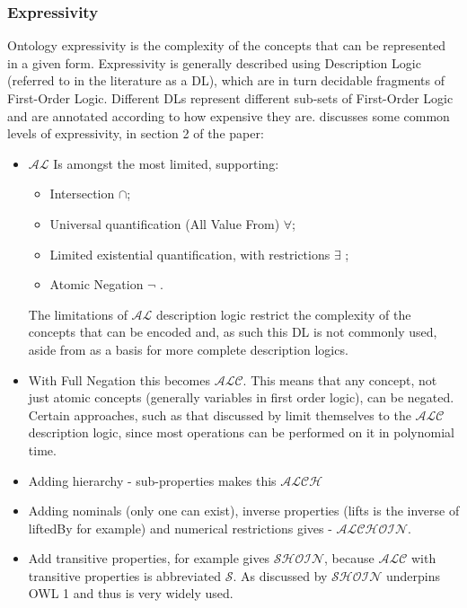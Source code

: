 \subsubsection{Expressivity}
Ontology expressivity is the complexity of the concepts that can be represented in a given form. Expressivity is generally described using Description Logic (referred to in the literature as a DL), which are in turn decidable fragments of First-Order Logic. Different DLs represent different sub-sets of First-Order Logic and are annotated according to how expensive they are. 
\citet{Horridge2012} discusses some common levels of expressivity, in section 2 of the paper:
\begin{itemize}
    \item  \(\mathcal{AL}\) Is amongst the most limited, supporting:
        \begin{itemize}
            \item   Intersection  \(\cap\);
            \item   Universal quantification (All Value From) \( \forall \);
            \item   Limited existential quantification, with restrictions \( \exists\) ;
            \item   Atomic Negation \(\neg \) .
        \end{itemize}        
        The limitations of \(\mathcal{AL}\) description logic restrict the complexity of the concepts that can be encoded and, as such this DL is not commonly used, aside from as a basis for more complete description logics.
        \item With Full Negation this becomes  \(\mathcal{ALC}\). This means that any concept, not just atomic concepts (generally variables in first order logic), can be negated. Certain approaches, such as that discussed by \citet{Meyer2006} limit themselves to the \(\mathcal{ALC}\) description logic, since most operations can be performed on it in polynomial time.
        \item Adding hierarchy - sub-properties makes this \(\mathcal{ALCH}\)
        \item Adding nominals (only one can exist), inverse properties (lifts is the inverse of liftedBy for example) and numerical restrictions gives - \(\mathcal{ALCHOIN}\). 
        \item Add transitive properties, for example  gives \(\mathcal{SHOIN}\), because \(\mathcal{ALC}\) with transitive properties is abbreviated \(\mathcal{S}\). As discussed by \citet{Horrocks2006a} \(\mathcal{SHOIN}\) underpins OWL 1 and thus is very widely used.  
\end{itemize}
